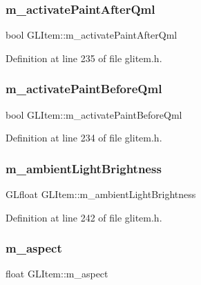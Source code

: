 \subsubsection{\texorpdfstring{m\_activatePaintAfterQml}{m\_activatePaintAfterQml}}
{\footnotesize\ttfamily bool G\+L\+Item\+::m\+\_\+activate\+Paint\+After\+Qml\hspace{0.3cm}{\ttfamily [protected]}}



Definition at line 235 of file glitem.\+h.

\mbox{\label{class_g_l_item_a6034466c7a88892138e14294876144b7}} 
\subsubsection{\texorpdfstring{m\_activatePaintBeforeQml}{m\_activatePaintBeforeQml}}
{\footnotesize\ttfamily bool G\+L\+Item\+::m\+\_\+activate\+Paint\+Before\+Qml\hspace{0.3cm}{\ttfamily [protected]}}



Definition at line 234 of file glitem.\+h.

\mbox{\label{class_g_l_item_a81f1697f1783f043c424fca09eb5a2a5}} 
\subsubsection{\texorpdfstring{m\_ambientLightBrightness}{m\_ambientLightBrightness}}
{\footnotesize\ttfamily G\+Lfloat G\+L\+Item\+::m\+\_\+ambient\+Light\+Brightness\hspace{0.3cm}{\ttfamily [protected]}}



Definition at line 242 of file glitem.\+h.

\mbox{\label{class_g_l_item_a497f7f25c40790bf88b354b6ea432512}} 
\subsubsection{\texorpdfstring{m\_aspect}{m\_aspect}}
{\footnotesize\ttfamily float G\+L\+Item\+::m\+\_\+aspect\hspace{0.3cm}{\ttfamily [protected]}}



